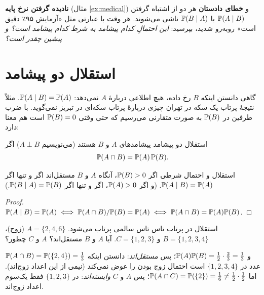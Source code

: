 \begin{warning}
\textbf{نادیده گرفتن نرخ پایه} (مثال \ref{ex:medical}) و \textbf{خطای دادستان} هر دو از اشتباه گرفتن $\P(A\mid B)$ با $\P(B\mid A)$ ناشی می‌شوند. هر وقت با عبارتی مثل «آزمایش ۹۵٪ دقیق است» روبه‌رو شدید، بپرسید: \emph{این احتمالِ کدام پیشامد به شرط کدام پیشامد است؟ و پیشین چقدر است؟}
\end{warning}

\section{استقلال دو پیشامد}
\label{sec:indep}

گاهی دانستن اینکه $B$ رخ داده، هیچ اطلاعی دربارهٔ $A$ نمی‌دهد: $\P(A\mid B)=\P(A)$. مثلاً نتیجهٔ پرتاب یک سکه در تهران چیزی دربارهٔ پرتاب سکه‌ای در تبریز نمی‌گوید. با ضرب طرفین در $\P(B)$ به صورت متقارنی می‌رسیم که حتی وقتی $\P(B)=0$ است هم معنا دارد:

\begin{definition}[label=def:indep]{استقلال دو پیشامد}
پیشامدهای $A$ و $B$  هستند (می‌نویسیم $A\perp B$) اگر
\[ \P(A\cap B)=\P(A)\,\P(B). \]
\end{definition}

\begin{proposition}[label=prop:indep-cond]{استقلال و احتمال شرطی}
اگر $\P(B)>0$، آنگاه $A$ و $B$ مستقل‌اند اگر و تنها اگر $\P(A\mid B)=\P(A)$. (و اگر $\P(A)>0$، اگر و تنها اگر $\P(B\mid A)=\P(B)$.)
\end{proposition}

\begin{proof}
$\P(A\mid B)=\P(A)\iff\P(A\cap B)/\P(B)=\P(A)\iff\P(A\cap B)=\P(A)\P(B)$.
\end{proof}

\begin{example}[label=ex:die-indep]{استقلال در پرتاب تاس}
تاس سالمی پرتاب می‌شود. $A=\{2,4,6\}$ (زوج)، $B=\{1,2,3,4\}$ و $C=\{1,2,3\}$. آیا $A$ و $B$ مستقل‌اند؟ $A$ و $C$ چطور؟
\begin{solution}
$\P(A\cap B)=\P(\{2,4\})=\tfrac13$ و $\P(A)\P(B)=\tfrac12\cdot\tfrac23=\tfrac13$؛ پس \emph{مستقل‌اند}: دانستن اینکه عدد در $\{1,2,3,4\}$ است احتمال زوج بودن را عوض نمی‌کند (نیمی از این اعداد زوج‌اند).
اما $\P(A\cap C)=\P(\{2\})=\tfrac16\ne\tfrac12\cdot\tfrac12$؛ پس $A$ و $C$ \emph{وابسته‌اند}: در $\{1,2,3\}$ فقط یک‌سوم اعداد زوج‌اند.
\end{solution}
\end{example}

